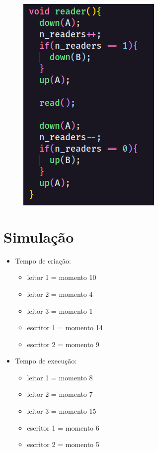 \documentclass[12pt, a4paper]{article}
\begin{document}
\begin{figure}[!htb]
	\centering
	\includegraphics[keepaspectratio]{4.png}
	\caption{\label{fig:4.png}}
\end{figure}


\section{Simulação}
\begin{itemize}
	\item Tempo de criação:
	\begin{itemize}
			\item leitor 1 = momento 10
			\item leitor 2 = momento 4
			\item leitor 3 = momento 1
			\item escritor 1 = momento 14
			\item escritor 2 = momento 9
	\end{itemize}
	\item Tempo de execução:
		\begin{itemize}
			\item leitor 1 = momento 8
			\item leitor 2 = momento 7
			\item leitor 3 = momento 15
			\item escritor 1 = momento 6
			\item escritor 2 = momento 5
		\end{itemize}
\end{itemize}
	 
\end{document}
